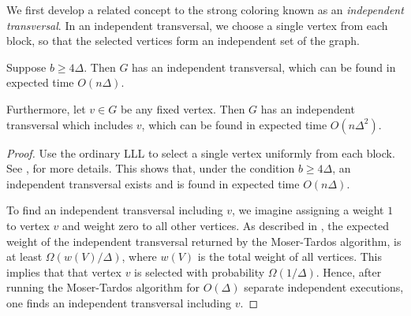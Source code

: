We first develop a related concept to the strong coloring known as an \emph{independent transversal}. In an independent transversal, we choose a single vertex from each block, so that the selected vertices form an independent set of the graph.
\begin{proposition}
\label{it-prop}
Suppose $b \geq 4 \Delta$. Then $G$ has an independent transversal, which can be found in expected time $O(n \Delta)$.

Furthermore, let $v \in G$ be any fixed vertex. Then $G$ has an independent transversal which includes $v$, which can be found in expected time $O(n \Delta^2)$.
\end{proposition}
\begin{proof}
Use the ordinary LLL to select a single vertex uniformly from each block. See \cite{bissacot}, \cite{harris-srin2} for more details. This shows that, under the condition $b \geq 4 \Delta$, an independent transversal exists and is found in expected time $O(n \Delta)$. 

To find an independent transversal including $v$, we imagine assigning a weight $1$ to vertex $v$ and weight zero to all other vertices. As described in \cite{harris-srin2}, the expected weight of the independent transversal returned by the Moser-Tardos algorithm, is at least $\Omega(w(V)/\Delta)$, where $w(V)$ is the total weight of all vertices. This implies that that vertex $v$ is selected with probability $\Omega(1/\Delta)$. Hence, after running the Moser-Tardos algorithm for $O(\Delta)$ separate independent executions, one finds an independent transversal including $v$.
\end{proof}

